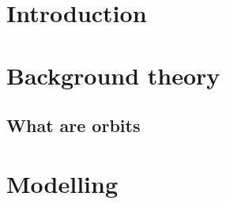 \documentclass[12pt]{article}
\begin{document}
    \tableofcontents
    \thispagestyle{empty}
    \newpage
    
 
    \addtocounter{page}{-1}
    \section{Introduction} %

    



        





    \section{Background theory}
        \subsection{What are orbits}
    \section{Modelling}

    
\end{document}

